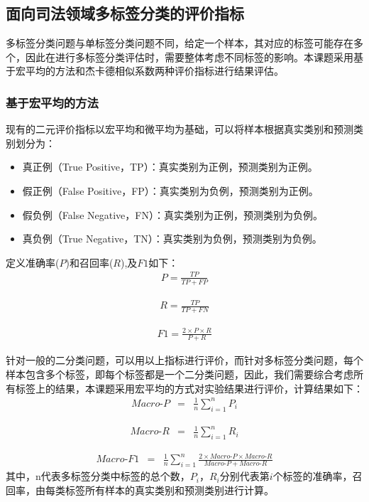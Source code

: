 \subsection{面向司法领域多标签分类的评价指标}
多标签分类问题与单标签分类问题不同，给定一个样本，其对应的标签可能存在多个，因此在进行多标签分类评估时，需要整体考虑不同标签的影响。本课题采用基于宏平均的方法和杰卡德相似系数两种评价指标进行结果评估。
\subsubsection{基于宏平均的方法}
现有的二元评价指标以宏平均和微平均为基础，可以将样本根据真实类别和预测类别划分为：
\begin{itemize}
    \item 真正例（True Positive，TP）：真实类别为正例，预测类别为正例。
    \item 假正例（False Positive，FP）：真实类别为负例，预测类别为正例。
    \item 假负例（False Negative，FN）：真实类别为正例，预测类别为负例。
    \item 真负例（True Negative，TN）：真实类别为负例，预测类别为负例。
\end{itemize}

定义准确率($P$)和召回率($R$),及$F1$如下：
\begin{eqnarray*}
P=\frac{TP}{TP+FP}
\end{eqnarray*}

\begin{eqnarray*}
R=\frac{TP}{TP+FN}
\end{eqnarray*}

\begin{eqnarray*}
F1=\frac{2\times P \times R}{P+R}
\end{eqnarray*}

针对一般的二分类问题，可以用以上指标进行评价，而针对多标签分类问题，每个样本包含多个标签，即每个标签都是一个二分类问题，因此，我们需要综合考虑所有标签上的结果，本课题采用宏平均的方式对实验结果进行评价，计算结果如下：
\begin{eqnarray*}
Macro\textrm{-}P &=& \frac{1}{n}\sum_{i=1}^{n}P_{i}
\end{eqnarray*}

\begin{eqnarray*}
Macro\textrm{-}R &=& \frac{1}{n}\sum_{i=1}^{n}R_{i}
\end{eqnarray*}

\begin{eqnarray*}
Macro\textrm{-}F1 &=& \frac{1}{n}\sum_{i=1}^{n}\frac{2\times Macro\textrm{-}P \times Macro\textrm{-}R}{Macro\textrm{-}P+Macro\textrm{-}R}
\end{eqnarray*}
其中，n代表多标签分类中标签的总个数，$P_i$，$R_i$分别代表第$i$个标签的准确率，召回率，由每类标签所有样本的真实类别和预测类别进行计算。

